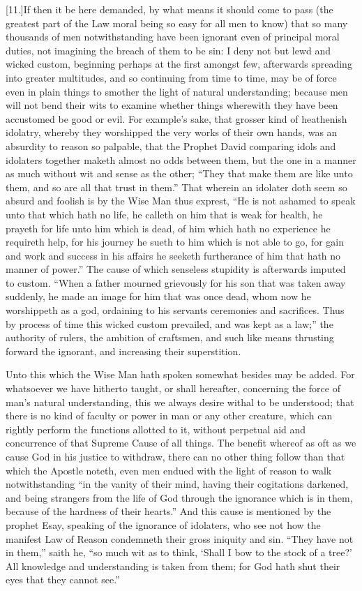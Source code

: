 [11.]If then it be here demanded, by what means it should come to pass (the greatest part of the Law moral being so easy for all men to know) that so many thousands of men notwithstanding have been ignorant even of principal moral duties, not imagining the breach of them to be sin: I deny not but lewd and wicked custom, beginning perhaps at the first amongst few, afterwards spreading into greater multitudes, and so continuing from time to time, may be of force even in plain things to smother the light of natural understanding; because men will not bend their wits to examine whether things wherewith they have been accustomed be good or evil. For example’s sake, that grosser kind of heathenish idolatry, whereby they worshipped the very works of their own hands, was an absurdity to reason so palpable, that the Prophet David comparing idols and idolaters together maketh almost no odds between them, but the one in a manner as much without wit and sense as the other; “They that make them are like unto them, and so are all that trust in them.” That wherein an idolater doth seem so absurd and foolish is by the Wise Man thus exprest, “He is not ashamed to speak unto that which hath no life, he calleth on him that is weak for health, he prayeth for life unto him which is dead, of him which hath no experience he requireth help, for his journey he sueth to him which is not able to go, for gain and work and success in his affairs he seeketh furtherance of him that hath no manner of power.” The cause of which senseless stupidity is afterwards imputed to custom. “When a father mourned grievously for his son that was taken away suddenly, he  made an image for him that was once dead, whom now he worshippeth as a god, ordaining to his servants ceremonies and sacrifices. Thus by process of time this wicked custom prevailed, and was kept as a law;” the authority of rulers, the ambition of craftsmen, and such like means thrusting forward the ignorant, and increasing their superstition.

Unto this which the Wise Man hath spoken somewhat besides may be added. For whatsoever we have hitherto taught, or shall hereafter, concerning the force of man’s natural understanding, this we always desire withal to be understood; that there is no kind of faculty or power in man or any other creature, which can rightly perform the functions allotted to it, without perpetual aid and concurrence of that Supreme Cause of all things. The benefit whereof as oft as we cause God in his justice to withdraw, there can no other thing follow than that which the Apostle noteth, even men endued with the light of reason to walk notwithstanding “in the vanity of their mind, having their cogitations darkened, and being strangers from the life of God through the ignorance which is in them, because of the hardness of their hearts.” And this cause is mentioned by the prophet Esay, speaking of the ignorance of idolaters, who see not how the manifest Law of Reason condemneth their gross iniquity and sin. “They have not in them,” saith he, “so much wit as to think, ‘Shall I bow to the stock of a tree?’ All knowledge and understanding is taken from them; for God hath shut their eyes that they cannot see.”

